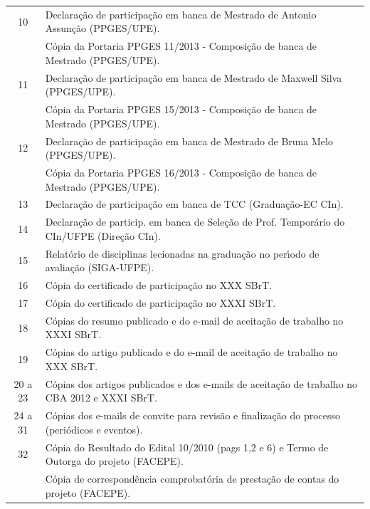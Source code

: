 \documentclass[a4paper,oneside,10pt]{article}
\begin{document}
\begin{table}[h]
\begin{tabular}{cl}
  \cmidrule{1-2}
  10 & Declara\c{c}\~{a}o de participa\c{c}\~{a}o em banca de Mestrado de Antonio Assun\c{c}\~{a}o (PPGES/UPE). \\
     & C\'{o}pia da Portaria PPGES 11/2013 - Composi\c{c}\~{a}o de banca de Mestrado (PPGES/UPE). \\
  \cmidrule{1-2}
  11 & Declara\c{c}\~{a}o de participa\c{c}\~{a}o em banca de Mestrado de Maxwell Silva (PPGES/UPE). \\
     & C\'{o}pia da Portaria PPGES 15/2013 - Composi\c{c}\~{a}o de banca de Mestrado (PPGES/UPE). \\
  \cmidrule{1-2}
  12 & Declara\c{c}\~{a}o de participa\c{c}\~{a}o em banca de Mestrado de Bruna Melo (PPGES/UPE). \\
     & C\'{o}pia da Portaria PPGES 16/2013 - Composi\c{c}\~{a}o de banca de Mestrado (PPGES/UPE). \\
  \cmidrule{1-2}
  13 & Declara\c{c}\~{a}o de participa\c{c}\~{a}o em banca de TCC (Gradua\c{c}\~{a}o-EC CIn). \\
  14 & Declara\c{c}\~{a}o de particip. em banca de Sele\c{c}\~{a}o de Prof. Tempor\'{a}rio do CIn/UFPE (Dire\c{c}\~{a}o CIn). \\
  15 & Relat\'{o}rio de disciplinas lecionadas na gradua\c{c}\~{a}o no per\'{\i}odo de avalia\c{c}\~{a}o (SIGA-UFPE).\\
  16 & C\'{o}pia do certificado de participa\c{c}\~{a}o no XXX SBrT. \\
  17 & C\'{o}pia do certificado de participa\c{c}\~{a}o no XXXI SBrT. \\
  18 & C\'{o}pias do resumo publicado e do e-mail de aceita\c{c}\~{a}o de trabalho no XXXI SBrT. \\
  19 & C\'{o}pias do artigo publicado e do e-mail de aceita\c{c}\~{a}o de trabalho no XXX SBrT. \\
  20 a 23 & C\'{o}pias dos artigos publicados e dos e-mails de aceita\c{c}\~{a}o de trabalho no CBA 2012 e XXXI SBrT. \\
  24 a 31 & C\'{o}pias dos e-mails de convite para revis\~{a}o e finaliza\c{c}\~{a}o do processo (peri\'{o}dicos e eventos). \\
  \cmidrule{1-2}
  32 & C\'{o}pia do Resultado do Edital 10/2010 (pags 1,2 e 6) e Termo de Outorga do projeto (FACEPE). \\
     & C\'{o}pia de correspond\^{e}ncia comprobat\'{o}ria de presta\c{c}\~{a}o de contas do projeto (FACEPE). \\

\end{tabular}
\end{table}
\end{document}
